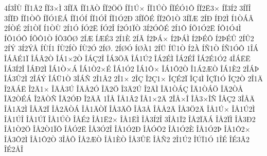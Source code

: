 {4^^cd3^^ce^^d9
^^cd^^cf1^^c22
^^cd^^cf3^^d7^^cc
3^^cd^^cf^^c4
^^cd^^cf1^^c4^^d2
^^cd^^cf2^^d6^^d6
^^cd^^cf1^^da^^d7
^^cd^^cf1^^da^^d2
^^cd^^cf^^c9^^d31^^d4
^^cd^^cf2^^cb3^^d7
^^cd^^cf3^^cd2
3^^cd^^cf^^ce
3^^cd^^cf^^d0
^^cd^^cf1^^d2^^d5
^^cd^^cf^^d31^^cb^^c1
^^cd^^cf1^^d3^^cd
^^cd^^cf1^^d3^^ce
^^cd^^cf1^^d32^^d0
3^^cd^^cf^^d4^^c9
^^cd^^cf2^^d41^^d2
3^^cd^^cf^^c6
2^^cd^^d0
^^cd^^d02^^cc
^^cd1^^d2^^c1^^c2
2^^cd^^d2^^c9
2^^cd1^^d2^^cf
^^cd1^^d2^^d9
2^^cd1^^d3
^^cd^^d32^^cb
^^cd^^d32^^ce
^^cd2^^d31^^cf^^d2
3^^cd2^^d3^^d4^^c9
2^^cd1^^d4
^^cd^^d51^^d32^^cb
^^cd^^d51^^d34^^cc
^^cd^^d51^^d3^^d4
^^cd^^d5^^d41^^d2
^^cd^^d53^^d4^^d8
2^^cd^^c6
^^cd^^c6^^c93
2^^cd1^^c8
2^^cd^^c3
^^cd2^^de^^c1^^d7
^^cd2^^de^^c1^^cc
^^cd2^^de^^c9^^d4
^^cd2^^de^^c9^^db
2^^cd^^db2
2^^cd^^dd
3^^cd2^^dd^^c5
^^cd^^d9^^cd1
^^cd^^d92^^cd^^d2
^^cd^^d92^^d3
2^^cd^^d8.
2^^cd^^d8^^d3
^^cd^^d8^^c01
2^^cd^^dc
^^cd^^dc1^^d2
^^cd2^^c0
^^cd^^d11^^d2
^^cd^^d11^^d3^^d4
1^^ce^^c1
^^ce^^c1^^c2^^c91^^cf
^^ce^^c1^^c22^^d2
^^ce^^c11^^d72^^d2
^^ce^^c1^^c72^^ce
^^ce^^c13^^d6^^c4
^^ce^^c11^^da2
^^ce^^c12^^c9^^cc
^^ce^^c12^^c9^^ce
^^ce^^c12^^c91^^d32
4^^ce^^c1^^cb^^cb
^^ce^^c13^^cd2^^ce
^^ce^^c1^^d02^^cc
^^ce^^c11^^d2^^d7^^c1
^^ce^^c11^^d22^^d7^^c9
^^ce^^c11^^d32
^^ce^^c11^^d4^^d7
^^ce^^c11^^d42^^d2
^^ce1^^c12^^c6^^d2
^^ce^^c11^^c82
2^^ce^^c1^^de
^^ce^^c13^^db2^^cc
2^^ce^^c1^^dd
^^ce^^c1^^dc1^^d2
3^^ce^^c1^^d1
2^^ce1^^c22
2^^ce1^^d7
2^^ce^^c7
^^ce2^^c71^^d7
^^ce^^c7^^c92^^cf
^^ce^^c74^^cc
^^ce^^c7^^cf1^^d3
^^ce^^c72^^d2
2^^ce1^^c4
^^ce2^^c4^^c1^^cb
^^ce2^^c41^^d7
^^ce^^c4^^c53^^da
^^ce^^c4^^c52^^d3
^^ce^^c42^^d6
^^ce3^^c42^^da
^^ce2^^c4^^cc
^^ce^^c41^^d2^^c1^^c7
^^ce^^c41^^d2^^c1^^d6
^^ce^^c42^^d2^^c5
^^ce^^c42^^d2^^c9^^c1
^^ce2^^c4^^d2^^d1
^^ce^^c42^^d3^^d0
^^ce2^^c4^^c3
1^^ce^^c5
^^ce^^c51^^c22
^^ce^^c51^^d72^^c4
2^^ce^^c5^^d7^^ce
^^ce^^c53^^d7^^ce^^d1
^^ce^^c5^^c72
3^^ce^^c5^^c4
^^ce^^c51^^c42^^cc
^^ce^^c5^^c42^^cf
^^ce^^c52^^c4^^d2^^c1
^^ce^^c51^^c4^^d2^^cf
^^ce^^c53^^c4^^d5
^^ce^^c53^^c5
^^ce^^c5^^c52^^c4
^^ce^^c53^^d62^^c4
^^ce^^c51^^da^^d7
^^ce^^c51^^da2^^cc
^^ce^^c51^^da^^ce
^^ce^^c51^^da^^cf
^^ce^^c51^^da^^d2
^^ce^^c5^^c92
^^ce^^c51^^cb2^^d7
^^ce^^c51^^cb^^cc
^^ce^^c53^^cd2^^ce
3^^ce^^c51^^cf2
^^ce^^c52^^cf^^c4^^c1
^^ce^^c52^^cf^^cc
^^ce^^c53^^d02
^^ce^^c51^^d22^^d6
^^ce^^c52^^d21^^cf^^d4
^^ce^^c5^^d32^^cb
^^ce^^c53^^d32^^ce
^^ce^^c51^^d32^^d0
^^ce^^c5^^d3^^d42
^^ce^^c51^^d32^^c8
^^ce^^c51^^d32^^de
^^ce^^c51^^d42^^d7
^^ce^^c53^^d42^^cc
^^ce^^c51^^d42^^d2
3^^ce^^c5^^d5
^^ce^^c52^^c6^^d2
^^ce^^c51^^c8^^d2
^^ce^^c53^^db^^cb
^^ce^^c5^^d12
2^^ce1^^da2
^^ce^^da^^cf1^^d3
1^^ce^^c9
^^ce^^c93^^c22
^^ce^^c92^^c5^^ce
}
